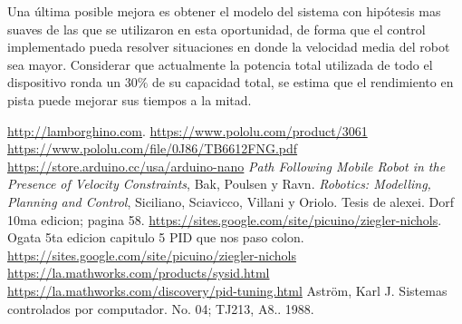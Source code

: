 \documentclass[10pt,conference,a4paper,onecolumn]{article}%
\begin{document}
Una última posible mejora es obtener el modelo del sistema con hipótesis mas suaves de las que se utilizaron en esta oportunidad, de forma que el control implementado pueda resolver situaciones en donde la velocidad media del robot sea mayor. Considerar que actualmente la potencia total utilizada de todo el dispositivo ronda un $30\%$ de su capacidad total, se estima que el rendimiento en pista puede mejorar sus tiempos a la mitad.   
\begin{thebibliography}{X}
 \url{http://lamborghino.com}. 
\url{https://www.pololu.com/product/3061}
\url{ https://www.pololu.com/file/0J86/TB6612FNG.pdf}
 \url{https://store.arduino.cc/usa/arduino-nano}
 \textit{Path Following Mobile Robot in the Presence of Velocity Constraints}, Bak, Poulsen y Ravn.
 \textit{Robotics: Modelling, Planning and Control}, Siciliano, Sciavicco, Villani y Oriolo.
 Tesis de alexei.
 Dorf 10ma edicion; pagina 58.
 \url{https://sites.google.com/site/picuino/ziegler-nichols}.
 Ogata 5ta edicion capitulo 5
 PID que nos paso colon.
\url{https://sites.google.com/site/picuino/ziegler-nichols}
\url{https://la.mathworks.com/products/sysid.html}
\url{https://la.mathworks.com/discovery/pid-tuning.html}
 Aström, Karl J. Sistemas controlados por computador. No. 04; TJ213, A8.. 1988.
\end{thebibliography}
\end{document}
